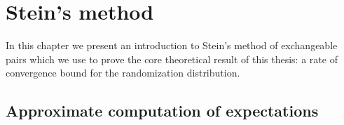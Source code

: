 \chapter{Stein's method}\label{C:steins-method}

In this chapter we present an introduction to Stein's method of
exchangeable pairs which we use to prove the core theoretical result
of this thesis: a rate of convergence bound for the randomization
distribution.

\section{Approximate computation of
  expectations}\label{S:approx-computation}







